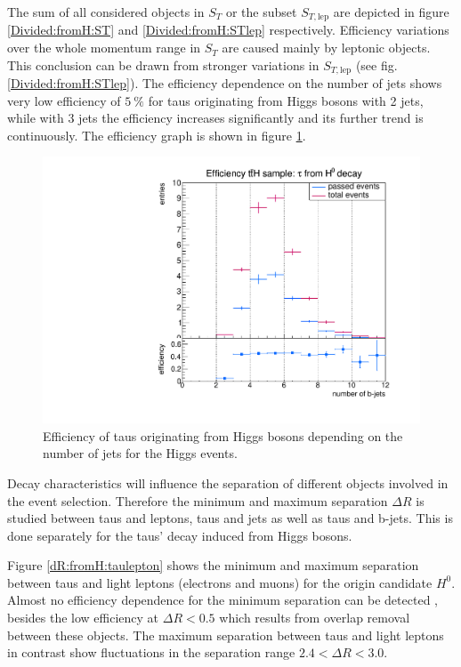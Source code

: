 %
The sum of all considered objects in $S_T$ or the subset $S_{T,\text{lep}}$ are depicted in figure \ref{Divided:fromH:ST} and \ref{Divided:fromH:STlep} respectively. Efficiency variations over the whole momentum range in $S_T$ are caused mainly by leptonic objects. This conclusion can be drawn from stronger variations in $S_{T,\text{lep}}$ (see fig. \ref{Divided:fromH:STlep}).\newline  
The efficiency dependence on the number of jets shows very low efficiency of $\SI{5}{\percent}$ for taus originating from Higgs bosons with 2 jets, while with 3 jets the efficiency increases significantly and its further trend is continuously. The efficiency graph is shown in figure \ref{Divided:fromH:njets}.\newline
%
\begin{figure}
  \centering
                \includegraphics[width=\textwidth]{figures/plots/ttH/Divided_fromHnjets.pdf}
\caption[Efficiency of taus originating from Higgs bosons depending on the number of jets for the Higgs events.]{Efficiency of taus originating from Higgs bosons depending on the number of jets for the Higgs events.}
\label{Divided:fromH:njets}
\end{figure}
%
Decay characteristics will influence the separation of different objects involved in the event selection. Therefore the minimum and maximum separation $\Delta R$ is studied between taus and leptons, taus and jets as well as taus and b-jets. This is done separately for the taus' decay induced from Higgs bosons.\par
Figure \ref{dR:fromH:taulepton} shows the minimum and maximum separation between taus and light leptons (electrons and muons) for the origin candidate $H^0$. Almost no efficiency dependence for the minimum separation can be detected , besides the low efficiency at $\Delta R<0.5$ which results from overlap removal between these objects. The maximum separation between taus and light leptons in contrast show fluctuations in the separation range $2.4<\Delta R<3.0$. \newline
